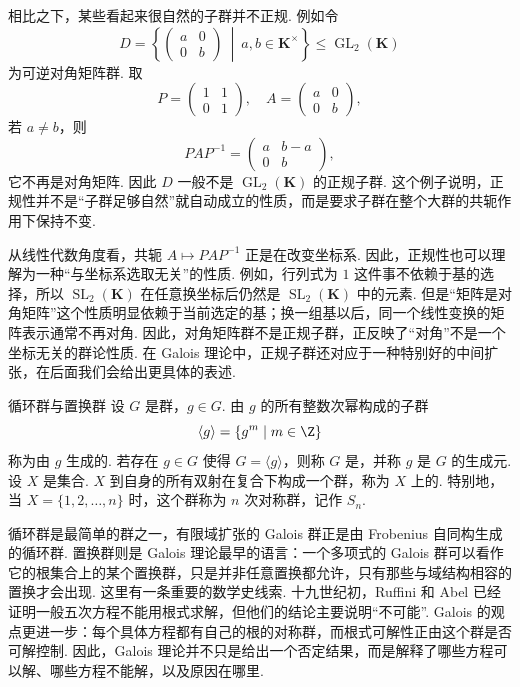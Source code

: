 相比之下，某些看起来很自然的子群并不正规. 例如令
\[
    D=\left\{
    \begin{pmatrix}
        a & 0\\
        0 & b
    \end{pmatrix}
    \ \middle|\ a,b\in\mathbf{K}^{\times}
    \right\}\leq \operatorname{GL}_2(\mathbf{K})
\]
为可逆对角矩阵群. 取
\[
    P=
    \begin{pmatrix}
        1 & 1\\
        0 & 1
    \end{pmatrix},\quad
    A=
    \begin{pmatrix}
        a & 0\\
        0 & b
    \end{pmatrix},
\]
若 $a\neq b$，则
\[
    PAP^{-1}
    =
    \begin{pmatrix}
        a & b-a\\
        0 & b
    \end{pmatrix},
\]
它不再是对角矩阵. 因此 $D$ 一般不是 $\operatorname{GL}_2(\mathbf{K})$ 的正规子群. 这个例子说明，正规性并不是``子群足够自然''就自动成立的性质，而是要求子群在整个大群的共轭作用下保持不变.

从线性代数角度看，共轭 $A\mapsto PAP^{-1}$ 正是在改变坐标系. 因此，正规性也可以理解为一种``与坐标系选取无关''的性质. 例如，行列式为 $1$ 这件事不依赖于基的选择，所以 $\operatorname{SL}_2(\mathbf{K})$ 在任意换坐标后仍然是 $\operatorname{SL}_2(\mathbf{K})$ 中的元素. 但是``矩阵是对角矩阵''这个性质明显依赖于当前选定的基；换一组基以后，同一个线性变换的矩阵表示通常不再对角. 因此，对角矩阵群不是正规子群，正反映了``对角''不是一个坐标无关的群论性质. 在 Galois 理论中，正规子群还对应于一种特别好的中间扩张，在后面我们会给出更具体的表述.

\begin{example}{循环群与置换群}
    设 $G$ 是群，$g\in G$. 由 $g$ 的所有整数次幂构成的子群
    \[
        \langle g\rangle=\{g^m\mid m\in\Z\}
    \]
    称为由 $g$ 生成的. 若存在 $g\in G$ 使得 $G=\langle g\rangle$，则称 $G$ 是，并称 $g$ 是 $G$ 的生成元. 设 $X$ 是集合. $X$ 到自身的所有双射在复合下构成一个群，称为 $X$ 上的. 特别地，当 $X=\{1,2,\ldots,n\}$ 时，这个群称为 $n$ 次对称群，记作 $S_n$.
\end{example}

循环群是最简单的群之一，有限域扩张的 Galois 群正是由 Frobenius 自同构生成的循环群. 置换群则是 Galois 理论最早的语言：一个多项式的 Galois 群可以看作它的根集合上的某个置换群，只是并非任意置换都允许，只有那些与域结构相容的置换才会出现. 这里有一条重要的数学史线索. 十九世纪初，Ruffini 和 Abel 已经证明一般五次方程不能用根式求解，但他们的结论主要说明``不可能''. Galois 的观点更进一步：每个具体方程都有自己的根的对称群，而根式可解性正由这个群是否可解控制. 因此，Galois 理论并不只是给出一个否定结果，而是解释了哪些方程可以解、哪些方程不能解，以及原因在哪里.

